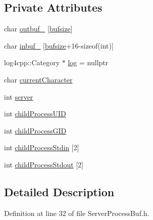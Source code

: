 \subsection*{Private Attributes}
\begin{DoxyCompactItemize}
\item 
char \hyperlink{class_minecraft_server_service_1_1_server_process_buf_a820751b906ffa5a37c0482f6fcd5f48d}{outbuf\+\_\+} \mbox{[}\hyperlink{class_minecraft_server_service_1_1_server_process_buf_a087f8bf390860bf7d926a92c809e7c50a11482eda7e1eb693c1ed0f5548a8a2b0}{bufsize}\mbox{]}
\item 
char \hyperlink{class_minecraft_server_service_1_1_server_process_buf_a7be8394c7d17d452ee61d87e8c807256}{inbuf\+\_\+} \mbox{[}\hyperlink{class_minecraft_server_service_1_1_server_process_buf_a087f8bf390860bf7d926a92c809e7c50a11482eda7e1eb693c1ed0f5548a8a2b0}{bufsize}+16-\/sizeof(int)\mbox{]}
\item 
log4cpp\+::\+Category $\ast$ \hyperlink{class_minecraft_server_service_1_1_server_process_buf_a56d2de15cde0e925e8bed6880a5025d5}{log} = nullptr
\item 
char \hyperlink{class_minecraft_server_service_1_1_server_process_buf_a0b8d691409b4ea56fa1e1e7bea4ffaed}{current\+Character}
\item 
int \hyperlink{class_minecraft_server_service_1_1_server_process_buf_acfea7246743c17f4baaef24cf4a33c2f}{server}
\item 
int \hyperlink{class_minecraft_server_service_1_1_server_process_buf_a383807da0dc587fe425f271f045f041e}{child\+Process\+U\+ID}
\item 
int \hyperlink{class_minecraft_server_service_1_1_server_process_buf_a17107a275ac36684cc46ad283ca9bfab}{child\+Process\+G\+ID}
\item 
int \hyperlink{class_minecraft_server_service_1_1_server_process_buf_a41c2c016c722f040450e4825c70c5302}{child\+Process\+Stdin} \mbox{[}2\mbox{]}
\item 
int \hyperlink{class_minecraft_server_service_1_1_server_process_buf_a921657ec0367eaf98d4eb997b279731d}{child\+Process\+Stdout} \mbox{[}2\mbox{]}
\end{DoxyCompactItemize}


\subsection{Detailed Description}


Definition at line 32 of file Server\+Process\+Buf.\+h.



